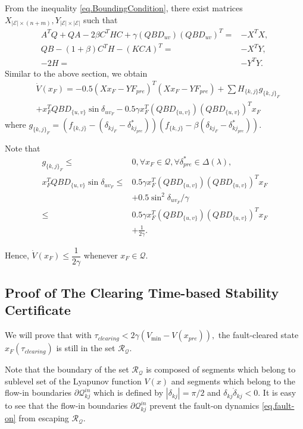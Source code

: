 \documentclass[final]{IEEEtran}
\begin{document}
From  the inequality \eqref{eq.BoundingCondition}, there exist
matrices $X_{|\mathcal{E}| \times (n+m)}, Y_{|\mathcal{E}|
\times|\mathcal{E}|}$
  such that
\begin{align}
  A^TQ+QA -2\beta C^THC+ \gamma (QBD_{uv})(QBD_{uv})^T = & -X^TX, \nonumber \\
  QB-(1+\beta)C^TH-(KCA)^T = &-X^TY, \nonumber \\
  -2H =& -Y^TY. \nonumber
\end{align}
Similar to the above section, we obtain
\begin{align}
\label{eq.dotV} &\dot{V}(x_F)=-0.5(Xx_F-YF_{pre})^T(Xx_F-YF_{pre})    + \sum H_{\{k,j\}}g_{\{k,j\}_F} \nonumber \\
    & +x_F^TQBD_{\{u,v\}}\sin\delta_{uv_F}-0.5\gamma x_F^T(QBD_{\{u,v\}})(QBD_{\{u,v\}})^Tx_F
  \end{align}
where
$g_{\{k,j\}_F}=(f_{\{k,j\}}-(\delta_{kj_F}-\delta_{{kj}_{pre}}^*))(f_{\{k,j\}}-\beta(\delta_{kj_F}-\delta_{kj_{pre}}^*)).$

 Note that
\begin{align}
 g_{\{k,j\}_F} \le &0, \forall x_F \in \mathcal{Q}, \forall \delta^*_{pre}\in\Delta(\lambda), \nonumber \\
 x_F^TQBD_{\{u,v\}}\sin\delta_{uv_F} \le & 0.5\gamma x_F^T(QBD_{\{u,v\}})(QBD_{\{u,v\}})^Tx_F \nonumber \\
 &+ 0.5\sin^2\delta_{uv_F}/\gamma \nonumber \\
                                     \le & 0.5\gamma x_F^T(QBD_{\{u,v\}})(QBD_{\{u,v\}})^Tx_F \nonumber \\&+ \frac{1}{2\gamma}.
\end{align}

Hence, $\dot{V}(x_F) \le \dfrac{1}{2\gamma}$ whenever $x_F \in
\mathcal{Q}.$


\subsection{Proof of The Clearing Time-based Stability Certificate}
\label{appendix.ClearingTimeCertificate} We will prove that with
$\tau_{clearing}<2\gamma(V_{\min}-V(x_{pre})),$ the fault-cleared
state $x_F(\tau_{clearing})$ is still in the set $\mathcal{R_Q}.$

Note that the boundary of the set $\mathcal{R_Q}$ is composed of
segments which belong to sublevel set of the Lyapunov function
$V(x)$ and segments which belong to the flow-in boundaries
$\partial\mathcal{Q}^{in}_{kj}$ which is defined by
$|\delta_{kj}|=\pi/2$ and $\delta_{kj}\dot{\delta}_{kj}<0.$ It is
easy to see that the flow-in boundaries
$\partial\mathcal{Q}^{in}_{kj}$ prevent the fault-on dynamics
\eqref{eq.fault-on} from escaping $\mathcal{R_Q}.$
\end{document}
